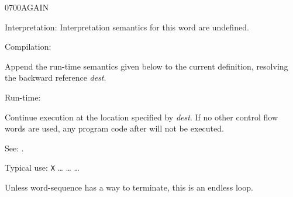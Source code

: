 \begin{newword*}{0700}{AGAIN}
\item[Interpretation:]
	Interpretation semantics for this word are undefined.

\item[Compilation:]

	Append the run-time semantics given below to the current
	definition, resolving the backward reference \emph{dest}.

\item[Run-time:]
	\stack{}{}

	Continue execution at the location specified by \emph{dest}.
	If no other control flow words are used, any program code
	after  will not be executed.

\item[See:]
	.

	\begin{rationale} %
		Typical use:
			\word{:} \texttt{X}
				{\ldots}  {\ldots} 
			{\ldots} \word{;}

		Unless word-sequence has a way to terminate, this is an
		endless loop.
	\end{rationale}
\end{newword*}


